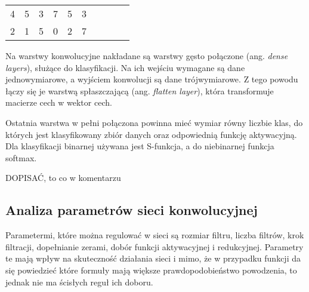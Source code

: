 \begin{table}[h]
{\begin{tabular}{llllllllll}
\multicolumn{1}{|l|}{\cellcolor[HTML]{FFCB2F}4} & \multicolumn{1}{l|}{\cellcolor[HTML]{FFCB2F}5}  & \multicolumn{1}{l|}{\cellcolor[HTML]{FFCB2F}3} & \multicolumn{1}{l|}{\cellcolor[HTML]{32CB00}7} & \multicolumn{1}{l|}{\cellcolor[HTML]{32CB00}5} & \multicolumn{1}{l|}{\cellcolor[HTML]{32CB00}3} &  &                       &                                                 &                                                \\ \cline{1-6}
\multicolumn{1}{|l|}{\cellcolor[HTML]{FFCB2F}2} & \multicolumn{1}{l|}{\cellcolor[HTML]{FFCB2F}1}  & \multicolumn{1}{l|}{\cellcolor[HTML]{FFCB2F}5} & \multicolumn{1}{l|}{\cellcolor[HTML]{32CB00}0} & \multicolumn{1}{l|}{\cellcolor[HTML]{32CB00}2} & \multicolumn{1}{l|}{\cellcolor[HTML]{32CB00}7} &  &                       &                                                 &                                                \\ \cline{1-6}
\end{tabular}%
}
\label{tab:tabela_max_pooling}
\end{table}


Na warstwy konwolucyjne nakładane są warstwy gęsto połączone (ang. \textit{dense layers}), służące do klasyfikacji. Na  ich wejściu wymagane są dane jednowymiarowe, a wyjściem konwolucji są dane trójwymiarowe. Z tego powodu łączy się je warstwą spłaszczającą (ang. \textit{flatten layer}), która transformuje macierze cech w wektor cech.

Ostatnia warstwa w pełni połączona powinna mieć wymiar równy liczbie klas, do których jest klasyfikowany zbiór danych oraz odpowiednią funkcję aktywacyjną. Dla klasyfikacji binarnej używana jest S-funkcja, a do niebinarnej funkcja softmax.

DOPISAĆ, to co w komentarzu

\subsection{Analiza parametrów sieci konwolucyjnej}

Parametermi, które można regulować w sieci są rozmiar filtru, liczba filtrów, krok filtracji, dopełnianie zerami, dobór funkcji aktywacyjnej i redukcyjnej. Parametry te mają wpływ na skuteczność działania sieci i mimo, że w przypadku funkcji da się powiedzieć które formuły mają większe prawdopodobieństwo powodzenia, to jednak nie ma ścisłych reguł ich doboru.

